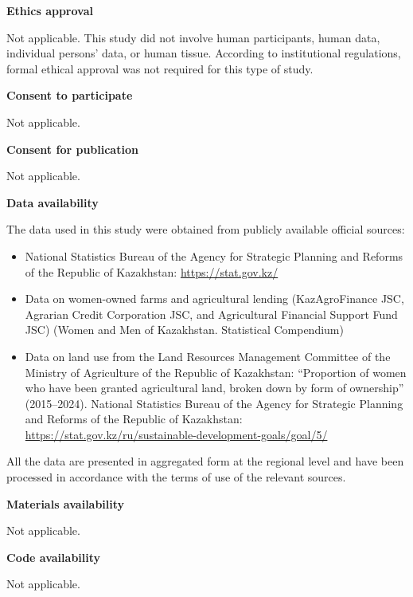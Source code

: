 ﻿\documentclass[pdflatex,sn-mathphys-ay]{sn-jnl}
\begin{document}
\medskip
\noindent\textbf{Ethics approval}

Not applicable. This study did not involve human participants, human
data, individual persons' data, or human tissue. According to
institutional regulations, formal ethical approval was not required for
this type of study.

\medskip
\noindent\textbf{Consent to participate}

Not applicable.

\medskip
\noindent\textbf{Consent for publication}

Not applicable.

\medskip
\noindent\textbf{Data availability}

The data used in this study were obtained from publicly available
official sources:

\begin{itemize}
\item National Statistics Bureau of the Agency for Strategic Planning
and Reforms of the Republic of Kazakhstan: \url{https://stat.gov.kz/}
\item Data on women-owned farms and agricultural lending
(KazAgroFinance JSC, Agrarian Credit Corporation JSC, and Agricultural
Financial Support Fund JSC) (Women and Men of Kazakhstan. Statistical
Compendium)
\item Data on land use from the Land Resources Management Committee of
the Ministry of Agriculture of the Republic of Kazakhstan: ``Proportion
of women who have been granted agricultural land, broken down by form of
ownership'' (2015--2024). National Statistics Bureau of the Agency for
Strategic Planning and Reforms of the Republic of Kazakhstan:
\url{https://stat.gov.kz/ru/sustainable-development-goals/goal/5/}
\end{itemize}

All the data are presented in aggregated form at the regional level and have
been processed in accordance with the terms of use of the relevant
sources.

\medskip
\noindent\textbf{Materials availability}

Not applicable.

\medskip
\noindent\textbf{Code availability}

Not applicable.


\end{document}
